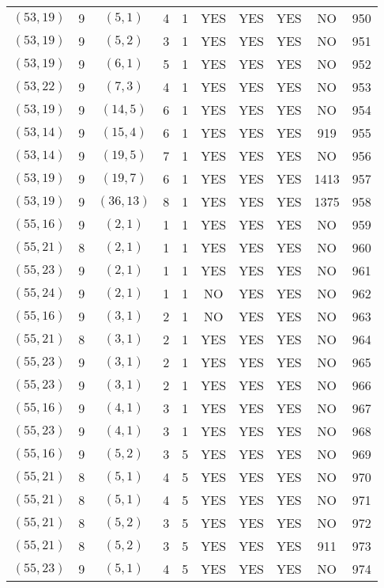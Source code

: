 \begin{longtable}{|c|c|c|c|c|c|c|c|c|c|}
$(53, 19)$ & 9 & $(5, 1)$ & 4 & 1 & YES & YES & YES & NO & 950\\
$(53, 19)$ & 9 & $(5, 2)$ & 3 & 1 & YES & YES & YES & NO & 951\\
$(53, 19)$ & 9 & $(6, 1)$ & 5 & 1 & YES & YES & YES & NO & 952\\
$(53, 22)$ & 9 & $(7, 3)$ & 4 & 1 & YES & YES & YES & NO & 953\\
$(53, 19)$ & 9 & $(14, 5)$ & 6 & 1 & YES & YES & YES & NO & 954\\
$(53, 14)$ & 9 & $(15, 4)$ & 6 & 1 & YES & YES & YES & 919 & 955\\
$(53, 14)$ & 9 & $(19, 5)$ & 7 & 1 & YES & YES & YES & NO & 956\\
$(53, 19)$ & 9 & $(19, 7)$ & 6 & 1 & YES & YES & YES & 1413 & 957\\
$(53, 19)$ & 9 & $(36, 13)$ & 8 & 1 & YES & YES & YES & 1375 & 958\\
$(55, 16)$ & 9 & $(2, 1)$ & 1 & 1 & YES & YES & YES & NO & 959\\
$(55, 21)$ & 8 & $(2, 1)$ & 1 & 1 & YES & YES & YES & NO & 960\\
$(55, 23)$ & 9 & $(2, 1)$ & 1 & 1 & YES & YES & YES & NO & 961\\
$(55, 24)$ & 9 & $(2, 1)$ & 1 & 1 & NO & YES & YES & NO & 962\\
$(55, 16)$ & 9 & $(3, 1)$ & 2 & 1 & NO & YES & YES & NO & 963\\
$(55, 21)$ & 8 & $(3, 1)$ & 2 & 1 & YES & YES & YES & NO & 964\\
$(55, 23)$ & 9 & $(3, 1)$ & 2 & 1 & YES & YES & YES & NO & 965\\
$(55, 23)$ & 9 & $(3, 1)$ & 2 & 1 & YES & YES & YES & NO & 966\\
$(55, 16)$ & 9 & $(4, 1)$ & 3 & 1 & YES & YES & YES & NO & 967\\
$(55, 23)$ & 9 & $(4, 1)$ & 3 & 1 & YES & YES & YES & NO & 968\\
$(55, 16)$ & 9 & $(5, 2)$ & 3 & 5 & YES & YES & YES & NO & 969\\
$(55, 21)$ & 8 & $(5, 1)$ & 4 & 5 & YES & YES & YES & NO & 970\\
$(55, 21)$ & 8 & $(5, 1)$ & 4 & 5 & YES & YES & YES & NO & 971\\
$(55, 21)$ & 8 & $(5, 2)$ & 3 & 5 & YES & YES & YES & NO & 972\\
$(55, 21)$ & 8 & $(5, 2)$ & 3 & 5 & YES & YES & YES & 911 & 973\\
$(55, 23)$ & 9 & $(5, 1)$ & 4 & 5 & YES & YES & YES & NO & 974\\

\end{longtable}
